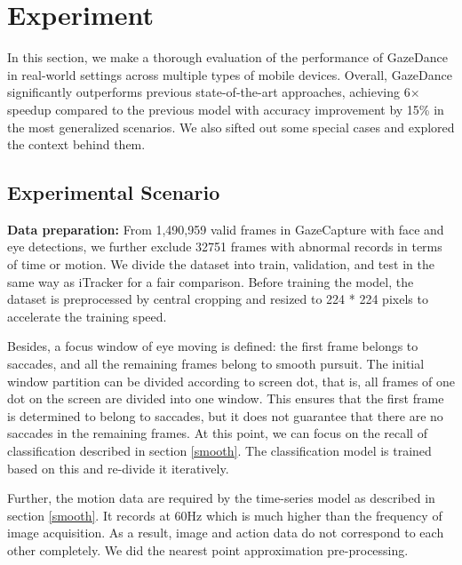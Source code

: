 \documentclass[acmlarge]{acmart}
\begin{document}

\section{Experiment}
In this section, we make a thorough evaluation of the performance of GazeDance in real-world settings across multiple types of mobile devices. Overall, GazeDance significantly outperforms previous state-of-the-art approaches, achieving 6× speedup compared to the previous model with accuracy improvement by 15\% in the most generalized scenarios. We also sifted out some special cases and explored the context behind them.

\subsection{Experimental Scenario}\label{subsec:experiment scenario}

\textbf{Data preparation:} From 1,490,959 valid frames in GazeCapture with face and eye detections, we further exclude 32751 frames with abnormal records in terms of time or motion. We divide the dataset into train, validation, and test in the same way as iTracker for a fair comparison. Before training the model, the dataset is preprocessed by central cropping and resized to 224 * 224 pixels to accelerate the training speed.

Besides, a focus window of eye moving is defined: the first frame belongs to saccades, and all the remaining frames belong to smooth pursuit. The initial window partition can be divided according to screen dot, that is, all frames of one dot on the screen are divided into one window. This ensures that the first frame is determined to belong to saccades, but it does not guarantee that there are no saccades in the remaining frames. At this point, we can focus on the recall of classification described in section \ref{smooth}. The classification model is trained based on this and re-divide it iteratively.
    
Further, the motion data are required by the time-series model as described in section \ref{smooth}. It records at 60Hz which is much higher than the frequency of image acquisition. As a result, image and action data do not correspond to each other completely. We did the nearest point approximation pre-processing.

\end{document}

